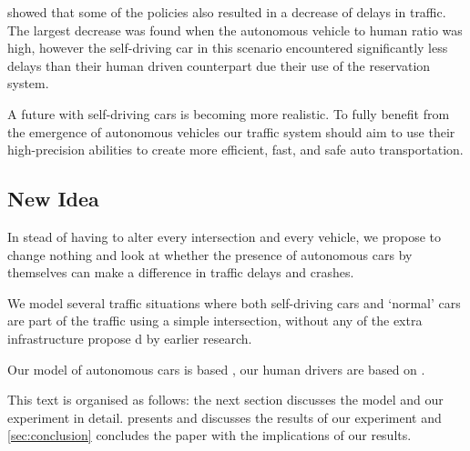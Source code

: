 \textcite{dresner2007sharing} showed that some of the policies also resulted in a decrease of delays in traffic. The largest decrease was found when the autonomous vehicle to human ratio was high, however the self-driving car in this scenario encountered significantly less delays than their human driven counterpart due their use of the reservation system.

A future with self-driving cars is becoming more realistic. To fully benefit from the emergence of autonomous vehicles our traffic system should aim to use their high-precision abilities to create more efficient, fast, and safe auto transportation.


\subsection{New Idea}
\label{sub:intro:new_idea}	
In stead of having to alter every intersection and every vehicle, we propose to change nothing and look at whether the presence of autonomous cars by themselves can make a difference in traffic delays and crashes. 

We model several traffic situations where both self-driving cars and `normal' cars are part of the traffic using a simple intersection, without any of the extra infrastructure propose d by earlier research. 


Our model of autonomous cars is based \textcite{jiang2010microscopic}, our human drivers are based on \textcite{paruchuri2002multi}.

This text is organised as follows: the next section discusses the model and our experiment in detail.  presents and discusses the results of our experiment and \cref{sec:conclusion} concludes the paper with the implications of our results.